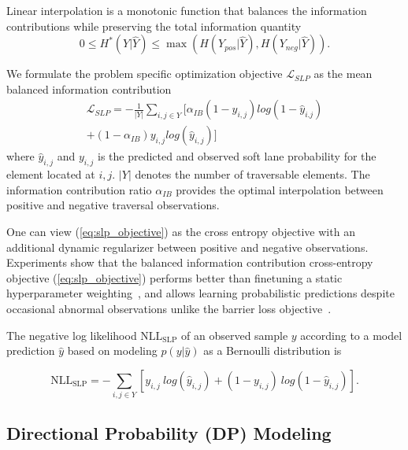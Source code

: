 \documentclass[letterpaper, 10 pt, conference]{ieeeconf}
\begin{document}
Linear interpolation is a monotonic function that balances the information contributions while preserving the total information quantity
\begin{equation}
    0 \le H^*(Y|\hat{Y}) \le \max(H(Y_{pos}|\hat{Y}), H(Y_{neg}|\hat{Y})).
\end{equation}

We formulate the problem specific optimization objective $\mathcal{L}_{SLP}$ as the mean balanced information contribution
\begin{equation}
\begin{gathered}
  \mathcal{L}_{SLP} = - \frac{1}{|Y|} \sum_{i,j \in Y} [ \alpha_{IB} (1-y_{i,j}) log (1-\hat{y}_{i.j}) \\ + (1-\alpha_{IB}) y_{i,j} log (\hat{y}_{i,j}) ]
\end{gathered}
\label{eq:slp_objective}
\end{equation}
\noindent where $\hat{y}_{i,j}$ and $y_{i,j}$ is the predicted and observed soft lane probability for the element located at $i,j$. $|Y|$ denotes the number of traversable elements. The information contribution ratio $\alpha_{IB}$ provides the optimal interpolation between positive and negative traversal observations.



One can view (\ref{eq:slp_objective}) as the cross entropy objective with an additional dynamic regularizer between positive and negative observations. Experiments show that the balanced information contribution cross-entropy objective (\ref{eq:slp_objective}) performs better than finetuning a static hyperparameter weighting~\cite{karlsson2020dsla}, and allows learning probabilistic predictions despite occasional abnormal observations unlike the barrier loss objective~\cite{karlsson2021gdsla}.


The negative log likelihood $\text{NLL}_{\text{SLP}}$ of an observed sample $y$ according to a model prediction $\hat{y}$ based on modeling $p(y|\hat{y})$ as a Bernoulli distribution is

\begin{equation}
    \text{NLL}_{\text{SLP}} = - \sum_{i,j \in Y} \left[ y_{i,j} \: log (\hat{y}_{i,j}) + (1-y_{i,j}) \: log (1 - \hat{y}_{i,j}) \right].
\label{eq:nll_slp}
\end{equation}





\subsection{Directional Probability (DP) Modeling}
\end{document}
